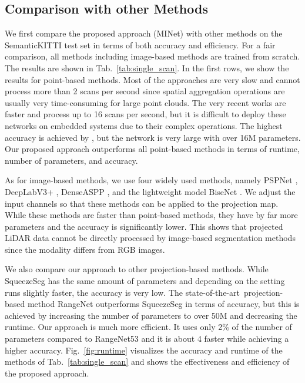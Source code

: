 \documentclass[letterpaper, 10 pt, journal, twoside]{ieeetran}
\newcommand{\figref}[1]{Fig.~\ref{#1}}
\newcommand{\tabref}[1]{Tab.~\ref{#1}}
\def\sArt{{state-of-the-art~}}
\newcommand{\todo}[1]{#1}
\begin{document}
\subsection{Comparison with other Methods}
We first compare the proposed approach (MINet) with other methods on the SemanticKITTI test set in terms of both accuracy and efficiency.
\todo{For a fair comparison, all methods including image-based methods are trained from scratch.}
The results are shown in \tabref{tab:single_scan}. In the first rows, we show the results for point-based methods. Most of the approaches are very slow and cannot process more than 2 scans per second since spatial aggregation operations are usually very time-consuming for large point clouds. 
The very recent works \cite{li2020projected,hu2019randla,zhang2020polarnet} are faster and process up to 16 scans per second, but it is difficult to deploy these networks on embedded systems due to their complex operations. The highest accuracy is achieved by \cite{zhang2020polarnet}, but the network is very large with over 16M parameters. Our proposed approach outperforms all point-based methods in terms of runtime, number of parameters, and accuracy. 






As for image-based methods, we use four widely used methods, namely PSPNet \cite{zhao2017pyramid}, DeepLabV3+ \cite{chen2018encoder}, DenseASPP \cite{yang2018denseaspp}, and the lightweight model BiseNet \cite{yu2018bisenet}.
We adjust the input channels so that these methods can be applied to the projection map.
While these methods are faster than point-based methods, they have by far more parameters and the accuracy is significantly lower. This shows that projected LiDAR data cannot be directly processed by image-based segmentation methods since the modality differs from RGB images. 

We also compare our approach to other projection-based methods. While SqueezeSeg \cite{wu2018squeezeseg, wu2019squeezesegv2} has the same amount of parameters and depending on the setting runs slightly faster, the accuracy is very low. The \sArt projection-based method RangeNet \cite{milioto2019rangenet++} outperforms SqueezeSeg in terms of accuracy, but this is achieved by increasing the number of parameters to over 50M and decreasing the runtime. Our approach is much more efficient. It uses only 2\% of the number of parameters compared to RangeNet53 and it is about 4 faster while achieving a higher accuracy. \figref{fig:runtime} visualizes the accuracy and runtime of the methods of \tabref{tab:single_scan} and shows the effectiveness and efficiency of the proposed approach.  
\end{document}
